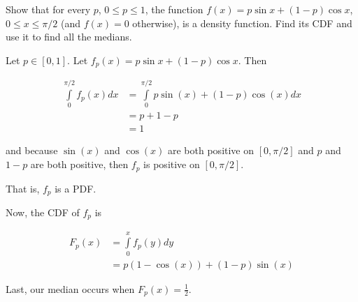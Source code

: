 \begin{problem}[Handout 12, \# 16]
  Show that for every \(p\), \(0\leq p\leq 1\), the function \(f(x)=p\sin
  x+(1-p)\cos x\), \(0\leq x\leq\pi/2\) (and \(f(x)=0\) otherwise), is a
  density function. Find its CDF and use it to find all the medians.
\end{problem}
\begin{solution}

Let $p \in [0,1]$. Let $f_p(x) = p\sin x+(1-p)\cos x$. Then

\begin{align*}
\int\limits_0^{\pi/2} f_p(x) dx &= \int\limits_0^{\pi/2} p \sin(x) + (1-p) \cos(x) dx\\
&= p + 1 - p\\
&=1
\end{align*}

and because $\sin(x)$ and $\cos(x)$ are both positive on $[0,\pi/2]$ and $p$ and $1-p$ are both positive, then $f_p$ is positive on $[0,\pi/2]$.

That is, $f_p$ is a PDF.

Now, the CDF of $f_p$ is

\begin{align*}
F_p(x) &= \int\limits_0^x f_p(y) dy \\
&= p(1 - \cos(x)) + (1-p) \sin(x)
\end{align*}

Last, our median occurs when $F_p(x) = \frac{1}{2}$.
\end{solution}
\newpage

